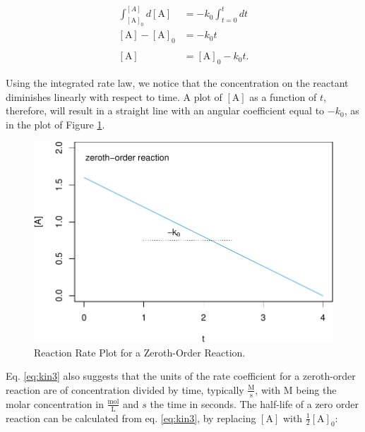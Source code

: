\documentclass[
  9pt,
]{extbook}
\theoremstyle{definition}
\theoremstyle{definition}
\theoremstyle{definition}
\theoremstyle{remark}
\begin{document}
\begin{equation}
\begin{aligned}
\int_{[\mathrm{A}]_0}^{[A]} d[\mathrm{A}] &= -k_0 \int_{t=0}^{t} dt \\
[\mathrm{A}]-[\mathrm{A}]_0 &= -k_0 t \\ \\
[\mathrm{A}]&=[\mathrm{A}]_0 -k_0 t.
\end{aligned}
\label{eq:kin3}
\end{equation}

Using the integrated rate law, we notice that the concentration on the reactant diminishes linearly with respect to time. A plot of \([\mathrm{A}]\) as a function of \(t\), therefore, will result in a straight line with an angular coefficient equal to \(-k_0\), as in the plot of Figure \ref{fig:figk1}.

\begin{figure}

{\centering \includegraphics{pchem1_files/figure-latex/figk1-1} 

}

\caption{Reaction Rate Plot for a Zeroth-Order Reaction.}\label{fig:figk1}
\end{figure}

Eq. \eqref{eq:kin3} also suggests that the units of the rate coefficient for a zeroth-order reaction are of concentration divided by time, typically \(\frac{\mathrm{M}}{\mathrm{s}}\), with \(\mathrm{M}\) being the molar concentration in \(\frac{\mathrm{mol}}{\mathrm{L}}\) and \(s\) the time in seconds.
The half-life of a zero order reaction can be calculated from eq. \eqref{eq:kin3}, by replacing \([\mathrm{A}]\) with \(\frac{1}{2}[\mathrm{A}]_0\):
\end{document}
